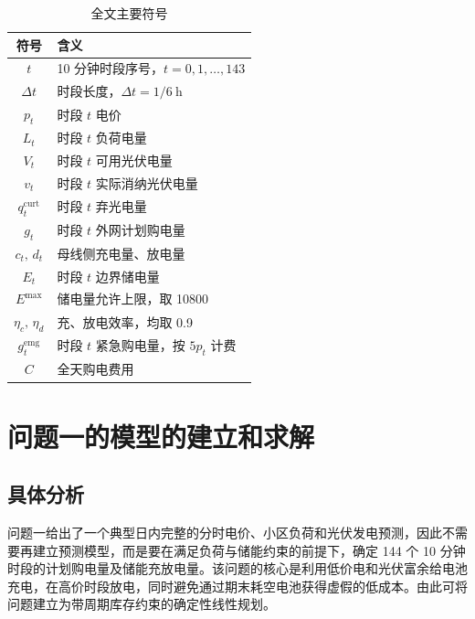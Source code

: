 \documentclass[withoutpreface,bwprint]{cumcmthesis}
\begin{document}
\begin{table}[htbp]
\centering
\caption{全文主要符号}
	\begin{tabularx}{\textwidth}{cL}
		\toprule
		符号    & 含义    \\
		\midrule
		$t$ & 10 分钟时段序号，$t=0,1,\ldots,143$ \\
		$\Delta t$ & 时段长度，$\Delta t=1/6\ \mathrm{h}$ \\
		$p_t$ & 时段 $t$ 电价 \\
		$L_t$ & 时段 $t$ 负荷电量 \\
		$V_t$ & 时段 $t$ 可用光伏电量 \\
		$v_t$ & 时段 $t$ 实际消纳光伏电量 \\
		$q_t^{\mathrm{curt}}$ & 时段 $t$ 弃光电量 \\
		$g_t$ & 时段 $t$ 外网计划购电量 \\
		$c_t,\,d_t$ & 母线侧充电量、放电量 \\
		$E_t$ & 时段 $t$ 边界储电量 \\
		$E^{\max}$ & 储电量允许上限，取 10800 \\
		$\eta_c,\,\eta_d$ & 充、放电效率，均取 0.9 \\
		$g_t^{\mathrm{emg}}$ & 时段 $t$ 紧急购电量，按 $5p_t$ 计费 \\
		$C$ & 全天购电费用 \\
		\bottomrule
	\end{tabularx}
	\label{tab:符号说明}
\end{table}











\section{问题一的模型的建立和求解}
\subsection{具体分析}

问题一给出了一个典型日内完整的分时电价、小区负荷和光伏发电预测，因此不需要再建立预测模型，而是要在满足负荷与储能约束的前提下，确定 144 个 10 分钟时段的计划购电量及储能充放电量。该问题的核心是利用低价电和光伏富余给电池充电，在高价时段放电，同时避免通过期末耗空电池获得虚假的低成本。由此可将问题建立为带周期库存约束的确定性线性规划。
\end{document}

